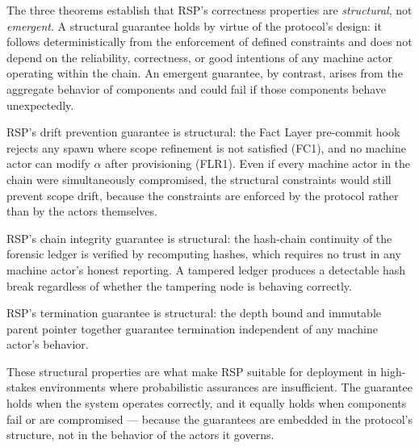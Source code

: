 The three theorems establish that RSP's correctness properties are \emph{structural}, not \emph{emergent}. A structural guarantee holds by virtue of the protocol's design: it follows deterministically from the enforcement of defined constraints and does not depend on the reliability, correctness, or good intentions of any machine actor operating within the chain. An emergent guarantee, by contrast, arises from the aggregate behavior of components and could fail if those components behave unexpectedly.

RSP's drift prevention guarantee is structural: the Fact Layer pre-commit hook rejects any spawn where scope refinement is not satisfied (FC1), and no machine actor can modify $\alpha$ after provisioning (FLR1). Even if every machine actor in the chain were simultaneously compromised, the structural constraints would still prevent scope drift, because the constraints are enforced by the protocol rather than by the actors themselves.

RSP's chain integrity guarantee is structural: the hash-chain continuity of the forensic ledger is verified by recomputing hashes, which requires no trust in any machine actor's honest reporting. A tampered ledger produces a detectable hash break regardless of whether the tampering node is behaving correctly.

RSP's termination guarantee is structural: the depth bound and immutable parent pointer together guarantee termination independent of any machine actor's behavior.

These structural properties are what make RSP suitable for deployment in high-stakes environments where probabilistic assurances are insufficient. The guarantee holds when the system operates correctly, and it equally holds when components fail or are compromised --- because the guarantees are embedded in the protocol's structure, not in the behavior of the actors it governs.